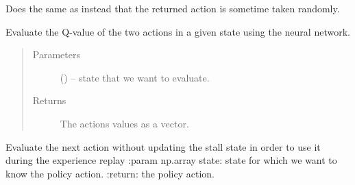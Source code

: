 \documentclass[letterpaper,10pt,english]{sphinxmanual}
\begin{document}
\begin{fulllineitems}

\begin{fulllineitems}
\label{\detokenize{package2:policyLearning.PolicyLearner.actUnderPolicy}}
Does the same as {\hyperref[\detokenize{package2:policyLearning.PolicyLearner.actDeterministicallyUnderPolicy}]{}} instead that the returned action
is sometime taken randomly.

\end{fulllineitems}


\begin{fulllineitems}
\label{\detokenize{package2:policyLearning.PolicyLearner.evaluate}}
Evaluate the Q-value of the two actions in a given state using the neural network.
\begin{quote}\begin{description}
\item[{Parameters}] \leavevmode
{} () -- state that we want to evaluate.

\item[{Returns}] \leavevmode
The actions values as a vector.

\end{description}\end{quote}

\end{fulllineitems}


\begin{fulllineitems}
\label{\detokenize{package2:policyLearning.PolicyLearner.evaluateNextAction}}
Evaluate the next action without updating the stall state in order to use it during the experience replay
:param np.array state: state for which we want to know the policy action.
:return: the policy action.

\end{fulllineitems}



\end{fulllineitems}
\end{document}
